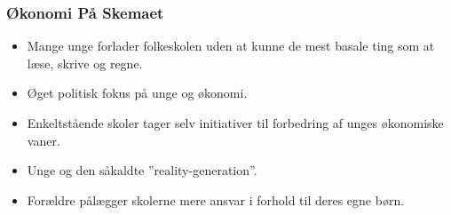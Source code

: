 
\begin{frame}
\frametitle{Økonomi På Skemaet}
    \begin{itemize}
        \item{Mange unge forlader folkeskolen uden at kunne de mest basale ting som at læse, skrive og regne.}

        \item{Øget politisk fokus på unge og økonomi.}

        \item{Enkeltstående skoler tager selv initiativer til forbedring af unges økonomiske vaner.}

        \item{Unge og den såkaldte ''reality-generation''.}

        \item{Forældre pålægger skolerne mere ansvar i forhold til deres egne børn.}
    \end{itemize}
\end{frame}
    
